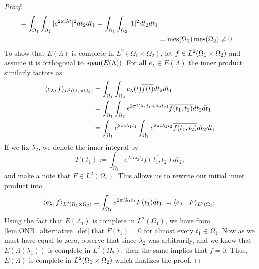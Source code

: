 \documentclass[../thesis.tex]{subfiles}
\begin{document}
\begin{proof}
\begin{align*}
        =\int_{\Omega_1} \int_{\Omega_2} |e^{2 \pi i \lambda t}|^2 dt_2 dt_1
        = \int_{\Omega_1} \int_{\Omega_2} |1|^2 dt_2 dt_1\\
        &= \operatorname{mes}(\Omega_1)\operatorname{mes}(\Omega_2) \neq 0
    \end{align*}
    To show that $E(\Lambda)$ is complete in $L^2(\Omega_1 \times \Omega_2)$, let $f\in L^2(\Omega_1 \times \Omega_2)$ and assume it is orthogonal to $\operatorname{span}(E(\Lambda))$. For all $e_\lambda \in E(\Lambda)$ the inner product similarly factors as
    \begin{align*} %
        \braa{e_\lambda,f}_{L^2\brac{\Omega_1 \times \Omega_2}}
        &= \int_{\Omega_1} \int_{\Omega_2} e_\lambda(t) \overline{f(t)} dt_2dt_1 \\
        &= \int_{\Omega_1} \int_{\Omega_2} e^{2\pi i  (\lambda_1 t_1 + \lambda_2 t_2)} \overline{f(t_1,t_2)} dt_2 dt_1 \\
        &= \int_{\Omega_1} e^{2 \pi i \lambda_1 t_1} \int_{\Omega_2}e^{2 \pi i \lambda_2 t_2} \overline{f(t_1,t_2)} dt_2 dt_1 \\
    \end{align*}
    If we fix $\lambda_2$, we denote the inner integral by 
    \begin{equation}\label{eq:inner_eq}
        F(t_1) := \int_{\Omega_2} e^{2 \pi i \lambda_2 t_2} \overline{f(t_1,t_2)} dt_2,
    \end{equation}
    and make a note that $F\in L^2(\Omega_1)$. This allows us to rewrite our initial inner product into
    \begin{equation}\label{eq:outter_eq}
        \langle e_{\lambda}, f\rangle_{L^2(\Omega_1\times \Omega_2)} = \int_{\Omega_1} e^{2 \pi i \lambda_1 t_1} F(t_1) dt_1 := \langle e_{\lambda_1}, F\rangle_{L^2(\Omega_1)}.
    \end{equation}
    Using the fact that $E(\Lambda_1)$ is complete in $L^2(\Omega_1)$, we have from \cref{lem:ONB_alternative_def} that $F(t_1)=0$ for almost every $t_1 \in \Omega_1$. Now as we must have  equal to zero, observe that since $\lambda_2$ was arbitrarily, and we know that $E(\Lambda(\lambda_1))$ is complete in $L^2(\Omega_2)$, then the same  implies that $f=0$. Thus, $E(\Lambda)$ is complete in $L^2(\Omega_1 \times \Omega_2)$ which finalizes the proof.
\end{proof}
\end{document}
